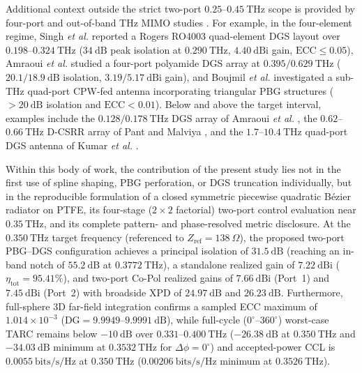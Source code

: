 \documentclass[referee,pdflatex,sn-mathphys-ay]{sn-jnl}
\begin{document}
Additional context outside the strict two-port \(0.25\)--\(0.45~\mathrm{THz}\) scope is provided by four-port and out-of-band THz MIMO studies \citep{khaleel2022,heliyon2024,boujmil2025_rio,singh2022,azzouz2026_rio,amraoui2024_sciaf,sharma2023,amraoui2024_rie,pant2024}. For example, in the four-element regime, Singh \textit{et al.} \citep{singh2022} reported a Rogers RO4003 quad-element DGS layout over \(0.198\)--\(0.324~\mathrm{THz}\) ($34~\mathrm{dB}$ peak isolation at $0.290~\mathrm{THz}$, $4.40~\mathrm{dBi}$ gain, $\mathrm{ECC} \le 0.05$), Amraoui \textit{et al.} \citep{amraoui2024_sciaf} studied a four-port polyamide DGS array at \(0.395 / 0.629~\mathrm{THz}\) ($20.1 / 18.9~\mathrm{dB}$ isolation, $3.19 / 5.17~\mathrm{dBi}$ gain), and Boujmil \textit{et al.} \citep{boujmil2025_rio} investigated a sub-THz quad-port CPW-fed antenna incorporating triangular PBG structures ($>20~\mathrm{dB}$ isolation and $\mathrm{ECC} < 0.01$). Below and above the target interval, examples include the \(0.128 / 0.178~\mathrm{THz}\) DGS array of Amraoui \textit{et al.} \citep{amraoui2024_rie}, the \(0.62\)--\(0.66~\mathrm{THz}\) D-CSRR array of Pant and Malviya \citep{pant2024}, and the \(1.7\)--\(10.4~\mathrm{THz}\) quad-port DGS antenna of Kumar \textit{et al.} \citep{heliyon2024}.

Within this body of work, the contribution of the present study lies not in the first use of spline shaping, PBG perforation, or DGS truncation individually, but in the reproducible formulation of a closed symmetric piecewise quadratic B\'ezier radiator on PTFE, its four-stage ($2 \times 2$ factorial) two-port control evaluation near \(0.35~\mathrm{THz}\), and its complete pattern- and phase-resolved metric disclosure. At the \(0.350~\mathrm{THz}\) target frequency (referenced to $Z_{\mathrm{ref}} = 138~\Omega$), the proposed two-port PBG--DGS configuration achieves a principal isolation of \(31.5~\mathrm{dB}\) (reaching an in-band notch of \(55.2~\mathrm{dB}\) at \(0.3772~\mathrm{THz}\)), a standalone realized gain of \(7.22~\mathrm{dBi}\) (\(\eta_{\mathrm{tot}} = 95.41\%\)), and two-port Co-Pol realized gains of \(7.66~\mathrm{dBi}\) (Port~1) and \(7.45~\mathrm{dBi}\) (Port~2) with broadside XPD of \(24.97~\mathrm{dB}\) and \(26.23~\mathrm{dB}\). Furthermore, full-sphere 3D far-field integration confirms a sampled ECC maximum of \(1.014\times10^{-3}\) (\(\mathrm{DG} = 9.9949\)--\(9.9991~\mathrm{dB}\)), while full-cycle ($0^{\circ}$--$360^{\circ}$) worst-case TARC remains below \(-10~\mathrm{dB}\) over \(0.331\)--\(0.400~\mathrm{THz}\) (\(-26.38~\mathrm{dB}\) at \(0.350~\mathrm{THz}\) and \(-34.03~\mathrm{dB}\) minimum at \(0.3532~\mathrm{THz}\) for $\Delta\phi = 0^{\circ}$) and accepted-power CCL is \(0.0055~\mathrm{bits/s/Hz}\) at \(0.350~\mathrm{THz}\) (\(0.00206~\mathrm{bits/s/Hz}\) minimum at \(0.3526~\mathrm{THz}\)).
\end{document}
